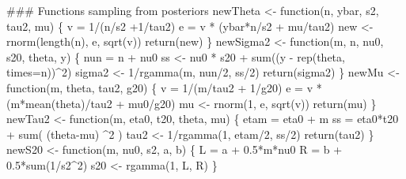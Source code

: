 \documentclass[]{article}
\newenvironment{Shaded}{\begin{snugshade}}{\end{snugshade}}
\newcommand{\KeywordTok}[1]{\textcolor[rgb]{0.94,0.87,0.69}{{#1}}}
\newcommand{\DataTypeTok}[1]{\textcolor[rgb]{0.87,0.87,0.75}{{#1}}}
\newcommand{\DecValTok}[1]{\textcolor[rgb]{0.86,0.86,0.80}{{#1}}}
\newcommand{\FloatTok}[1]{\textcolor[rgb]{0.75,0.75,0.82}{{#1}}}
\newcommand{\StringTok}[1]{\textcolor[rgb]{0.80,0.58,0.58}{{#1}}}
\newcommand{\NormalTok}[1]{\textcolor[rgb]{0.80,0.80,0.80}{{#1}}}
\begin{document}
\begin{Shaded}
\begin{Highlighting}[]
\NormalTok{### Functions sampling from posteriors}
\NormalTok{newTheta <-}\StringTok{ }\NormalTok{function(n, ybar, s2, tau2, mu)}
\NormalTok{\{}
  \NormalTok{v =}\StringTok{ }\DecValTok{1}\NormalTok{/(n/s2 +}\DecValTok{1}\NormalTok{/tau2)}
  \NormalTok{e =}\StringTok{ }\NormalTok{v *}\StringTok{ }\NormalTok{(ybar*n/s2 +}\StringTok{ }\NormalTok{mu/tau2)}
  \NormalTok{new <-}\StringTok{ }\KeywordTok{rnorm}\NormalTok{(}\KeywordTok{length}\NormalTok{(n), e, }\KeywordTok{sqrt}\NormalTok{(v))}
  \KeywordTok{return}\NormalTok{(new)}
\NormalTok{\}}
\NormalTok{newSigma2 <-}\StringTok{ }\NormalTok{function(m, n, nu0, s20, theta, y)}
\NormalTok{\{}
  \NormalTok{nun =}\StringTok{ }\NormalTok{n +}\StringTok{ }\NormalTok{nu0}
  \NormalTok{ss <-}\StringTok{ }\NormalTok{nu0 *}\StringTok{ }\NormalTok{s20 +}\StringTok{ }\KeywordTok{sum}\NormalTok{((y -}\StringTok{ }\KeywordTok{rep}\NormalTok{(theta, }\DataTypeTok{times=}\NormalTok{n))^}\DecValTok{2}\NormalTok{) }
  \NormalTok{sigma2 <-}\StringTok{ }\DecValTok{1}\NormalTok{/}\KeywordTok{rgamma}\NormalTok{(m, nun/}\DecValTok{2}\NormalTok{, ss/}\DecValTok{2}\NormalTok{)}
  \KeywordTok{return}\NormalTok{(sigma2)}
\NormalTok{\}}
\NormalTok{newMu <-}\StringTok{ }\NormalTok{function(m, theta, tau2, g20)}
\NormalTok{\{}
  \NormalTok{v =}\StringTok{ }\DecValTok{1}\NormalTok{/(m/tau2 +}\StringTok{ }\DecValTok{1}\NormalTok{/g20)}
  \NormalTok{e =}\StringTok{ }\NormalTok{v *(m*}\KeywordTok{mean}\NormalTok{(theta)/tau2 +}\StringTok{ }\NormalTok{mu0/g20)}
  \NormalTok{mu <-}\StringTok{ }\KeywordTok{rnorm}\NormalTok{(}\DecValTok{1}\NormalTok{, e, }\KeywordTok{sqrt}\NormalTok{(v))}
  \KeywordTok{return}\NormalTok{(mu)}
\NormalTok{\}}
\NormalTok{newTau2 <-}\StringTok{ }\NormalTok{function(m, eta0, t20, theta, mu)}
\NormalTok{\{}
  \NormalTok{etam =}\StringTok{ }\NormalTok{eta0 +}\StringTok{ }\NormalTok{m}
  \NormalTok{ss =}\StringTok{ }\NormalTok{eta0*t20 +}\StringTok{ }\KeywordTok{sum}\NormalTok{( (theta-mu) ^}\DecValTok{2} \NormalTok{)}
  \NormalTok{tau2 <-}\StringTok{ }\DecValTok{1}\NormalTok{/}\KeywordTok{rgamma}\NormalTok{(}\DecValTok{1}\NormalTok{, etam/}\DecValTok{2}\NormalTok{, ss/}\DecValTok{2}\NormalTok{)}
  \KeywordTok{return}\NormalTok{(tau2)}
\NormalTok{\}}
\NormalTok{newS20 <-}\StringTok{ }\NormalTok{function(m, nu0, s2, a, b)}
\NormalTok{\{}
  \NormalTok{L =}\StringTok{ }\NormalTok{a +}\StringTok{ }\FloatTok{0.5}\NormalTok{*m*nu0}
  \NormalTok{R =}\StringTok{ }\NormalTok{b +}\StringTok{ }\FloatTok{0.5}\NormalTok{*}\KeywordTok{sum}\NormalTok{(}\DecValTok{1}\NormalTok{/s2^}\DecValTok{2}\NormalTok{)}
  \NormalTok{s20 <-}\StringTok{ }\KeywordTok{rgamma}\NormalTok{(}\DecValTok{1}\NormalTok{, L, R)}
\NormalTok{\}}


\end{Highlighting}
\end{Shaded}
\end{document}
